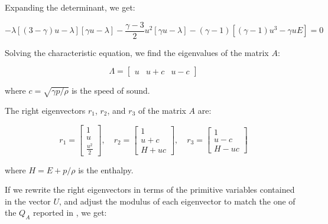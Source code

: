Expanding the determinant, we get:

\begin{equation}
    -\lambda \left[ (3 - \gamma) u - \lambda \right] \left[ \gamma u - \lambda \right] - \frac{\gamma - 3}{2} u^2 \left[ \gamma u - \lambda \right] - (\gamma - 1) \left[ (\gamma - 1) u^3 - \gamma u E \right] = 0
\end{equation}

Solving the characteristic equation, we find the eigenvalues of the matrix $A$:

\begin{equation}
    \Lambda = \begin{bmatrix}
        u & u + c & u - c
    \end{bmatrix}
    \label{eq:matrix_Lambda}
\end{equation}

where $c = \sqrt{\gamma p / \rho}$ is the speed of sound.

The right eigenvectors $r_1$, $r_2$, and $r_3$ of the matrix $A$ are:

\begin{equation}
    r_1 = \begin{bmatrix}
        1 \\
        u \\
        \frac{u^2}{2}
    \end{bmatrix}, \quad
    r_2 = \begin{bmatrix}
        1     \\
        u + c \\
        H + u c
    \end{bmatrix}, \quad
    r_3 = \begin{bmatrix}
        1     \\
        u - c \\
        H - u c
    \end{bmatrix}
    \label{eq:right_eigenvectors}
\end{equation}

where $H = E + p / \rho$ is the enthalpy.

If we rewrite the right eigenvectors in terms of the primitive variables contained in the vector $U$, and adjust the modulus of each eigenvector to match the one of the $Q_A$ reported in \cite{Ghia1982HighReSF}, we get:

